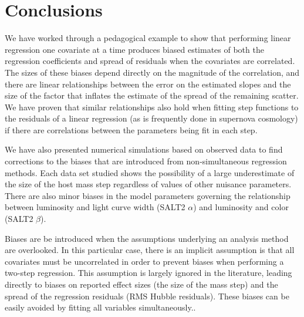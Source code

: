 \section{Conclusions}
\label{sec:conclusion}
We have worked through a pedagogical example to show that performing linear regression one covariate at a time produces biased estimates of both the regression coefficients and spread of residuals when the covariates are correlated. The sizes of these biases depend directly on the magnitude of the correlation, and there are linear relationships between the error on the estimated slopes and the size of the factor that inflates the estimate of the spread of the remaining scatter. We have proven that similar relationships also hold when fitting step functions to the residuals of a linear regression (as is frequently done in supernova cosmology) if there are correlations between the parameters being fit in each step. 

We have also presented numerical simulations based on observed data to find corrections to the biases that are introduced from non-simultaneous regression methods. Each data set studied shows the possibility of a large underestimate of the size of the host mass step regardless of values of other nuisance parameters. There are also minor biases in the model parameters governing the relationship between luminosity and light curve width (SALT2 $\alpha$) and luminosity and color (SALT2 $\beta$).

Biases are be introduced when the assumptions underlying an analysis method are overlooked. In this particular case, there is an implicit assumption is that all covariates must be uncorrelated in order to prevent biases when performing a two-step regression. This assumption is largely ignored in the literature, leading directly to biases on reported effect sizes (the size of the mass step) and the spread of the regression residuals (RMS Hubble residuals). These biases can be easily avoided by fitting all variables simultaneously..

